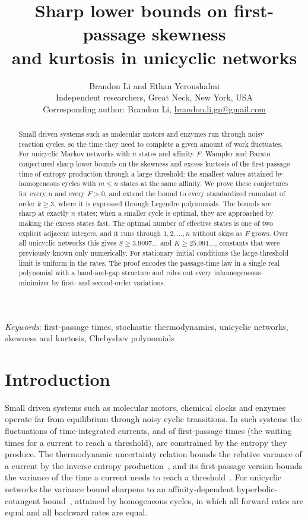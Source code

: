 \documentclass[11pt]{article}
\title{Sharp lower bounds on first-passage skewness\\ and kurtosis in unicyclic networks}
\author{Brandon Li and Ethan Yeroushalmi\\[0.35em]
 \normalsize Independent researchers, Great Neck, New York, USA\\[0.2em]
 \normalsize Corresponding author: Brandon Li,
 \href{mailto:brandon.li.gn@gmail.com}{brandon.li.gn@gmail.com}}
\date{}
\theoremstyle{remark}
\begin{document}
\maketitle

\begin{abstract}
Small driven systems such as molecular motors and enzymes run through noisy
reaction cycles, so the time they need to complete a given amount of work
fluctuates. For unicyclic Markov networks with $n$ states and affinity $F$,
Wampler and Barato conjectured sharp lower bounds on the skewness and excess
kurtosis of the first-passage time of entropy production through a large
threshold: the smallest values attained by homogeneous cycles with $m\le n$
states at the same affinity. We prove these conjectures for every $n$ and
every $F>0$, and extend the bound to every standardized cumulant of order
$k\ge3$, where it is expressed through Legendre polynomials. The bounds are
sharp at exactly $n$ states; when a smaller cycle is optimal, they are
approached by making the excess states fast. The optimal number of effective
states is one of two explicit adjacent integers, and it runs through
$1,2,\dots,n$ without skips as $F$ grows. Over all unicyclic networks this
gives $S\ge3.9097\ldots$ and $K\ge25.091\ldots$, constants that were
previously known only numerically. For stationary initial conditions
the large-threshold limit is uniform in the rates. The proof encodes the
passage-time law in a single real polynomial with a band-and-gap structure
and rules out every inhomogeneous minimizer by first- and second-order
variations.
\end{abstract}

\noindent\textit{Keywords}: first-passage times, stochastic thermodynamics,
unicyclic networks, skewness and kurtosis, Chebyshev polynomials

\section{Introduction}

Small driven systems such as molecular motors, chemical clocks and enzymes
operate far from equilibrium through noisy cyclic transitions. In such
systems the fluctuations of time-integrated currents, and of first-passage
times (the waiting times for a current to reach a threshold), are
constrained by the entropy they produce. The thermodynamic uncertainty
relation bounds the relative variance of a current by the inverse entropy
production~\cite{bstur,gingrich}, and its first-passage version bounds the variance of the time a
current needs to reach a threshold~\cite{garrahan,gh}. For unicyclic
networks the variance bound sharpens to an affinity-dependent
hyperbolic-cotangent bound~\cite{pbs,pbsproof}, attained by homogeneous
cycles, in which all forward rates are equal and all backward rates are
equal.
\end{document}

